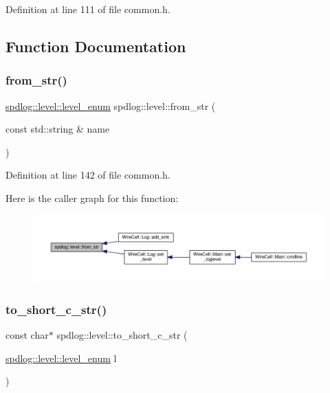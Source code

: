 Definition at line 111 of file common.\+h.



\subsection{Function Documentation}
\mbox{\label{namespacespdlog_1_1level_aad88aa14232ac8b65ee62f8e5ad3df5a}} 
\subsubsection{\texorpdfstring{from\+\_\+str()}{from\_str()}}
{\footnotesize\ttfamily \hyperlink{namespacespdlog_1_1level_a35f5227e5daf228d28a207b7b2aefc8b}{spdlog\+::level\+::level\+\_\+enum} spdlog\+::level\+::from\+\_\+str (\begin{DoxyParamCaption}\item[{const std\+::string \&}]{name }\end{DoxyParamCaption})\hspace{0.3cm}{\ttfamily [inline]}}



Definition at line 142 of file common.\+h.

Here is the caller graph for this function\+:
\nopagebreak
\begin{figure}[H]
\begin{center}
\leavevmode
\includegraphics[width=350pt]{namespacespdlog_1_1level_aad88aa14232ac8b65ee62f8e5ad3df5a_icgraph}
\end{center}
\end{figure}
\mbox{\label{namespacespdlog_1_1level_ac33524043deb648efa6d0a83bdcaeabc}} 
\subsubsection{\texorpdfstring{to\+\_\+short\+\_\+c\+\_\+str()}{to\_short\_c\_str()}}
{\footnotesize\ttfamily const char$\ast$ spdlog\+::level\+::to\+\_\+short\+\_\+c\+\_\+str (\begin{DoxyParamCaption}\item[{\hyperlink{namespacespdlog_1_1level_a35f5227e5daf228d28a207b7b2aefc8b}{spdlog\+::level\+::level\+\_\+enum}}]{l }\end{DoxyParamCaption})\hspace{0.3cm}{\ttfamily [inline]}}



